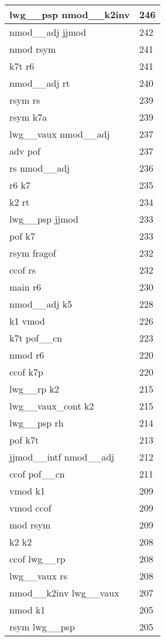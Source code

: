 \documentclass[a4 paper]{article}
\begin{document}
\begin{longtable}{p{}p{}}
lwg\_\_psp nmod\_\_k2inv  & 246 \\ \midrule
nmod\_\_adj jjmod  & 242 \\ \midrule
nmod rsym  & 241 \\ \midrule
k7t r6  & 241 \\ \midrule
nmod\_\_adj rt  & 240 \\ \midrule
rsym rs  & 239 \\ \midrule
rsym k7a  & 239 \\ \midrule
lwg\_\_vaux nmod\_\_adj  & 237 \\ \midrule
adv pof  & 237 \\ \midrule
rs nmod\_\_adj  & 236 \\ \midrule
r6 k7  & 235 \\ \midrule
k2 rt  & 234 \\ \midrule
lwg\_\_psp jjmod  & 233 \\ \midrule
pof k7  & 233 \\ \midrule
rsym fragof  & 232 \\ \midrule
ccof rs  & 232 \\ \midrule
main r6  & 230 \\ \midrule
nmod\_\_adj k5  & 228 \\ \midrule
k1 vmod  & 226 \\ \midrule
k7t pof\_\_cn  & 223 \\ \midrule
nmod r6  & 220 \\ \midrule
ccof k7p  & 220 \\ \midrule
lwg\_\_rp k2  & 215 \\ \midrule
lwg\_\_vaux\_cont k2  & 215 \\ \midrule
lwg\_\_psp rh  & 214 \\ \midrule
pof k7t  & 213 \\ \midrule
jjmod\_\_intf nmod\_\_adj  & 212 \\ \midrule
ccof pof\_\_cn  & 211 \\ \midrule
vmod k1  & 209 \\ \midrule
vmod ccof  & 209 \\ \midrule
mod rsym  & 209 \\ \midrule
k2 k2  & 208 \\ \midrule
ccof lwg\_\_rp  & 208 \\ \midrule
lwg\_\_vaux rs  & 208 \\ \midrule
nmod\_\_k2inv lwg\_\_vaux  & 207 \\ \midrule
nmod k1  & 205 \\ \midrule
rsym lwg\_\_psp  & 205 \\ \midrule

\end{longtable}
\end{document}
